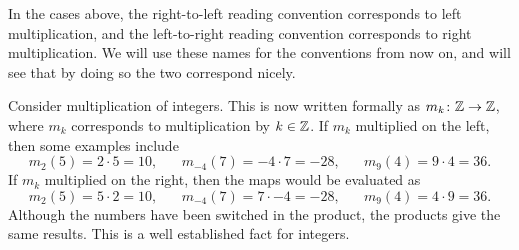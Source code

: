 In the cases above, the right-to-left reading convention corresponds to left multiplication, and the left-to-right reading convention corresponds to right multiplication. We will use these names for the conventions from now on, and will see that by doing so the two correspond nicely.

\begin{example}
    Consider multiplication of integers. This is now written formally as $m_{k} \colon \mathbb{Z} \to \mathbb{Z}$, where $m_{k}$ corresponds to multiplication by $k \in \mathbb{Z}$. If $m_{k}$ multiplied on the left, then some examples include
    \[
    m_{2}(5) = 2\cdot 5 = 10, \hspace{20pt} m_{-4}(7) = -4\cdot 7 = -28, \hspace{20pt} m_{9}(4) = 9\cdot 4 = 36.
    \]
    If $m_{k}$ multiplied on the right, then the maps would be evaluated as
    \[
    m_{2}(5) = 5\cdot 2 = 10, \hspace{20pt} m_{-4}(7) = 7\cdot -4 = -28, \hspace{20pt} m_{9}(4) = 4\cdot 9 = 36.
    \]
    Although the numbers have been switched in the product, the products give the same results. This is a well established fact for integers.
\end{example}

